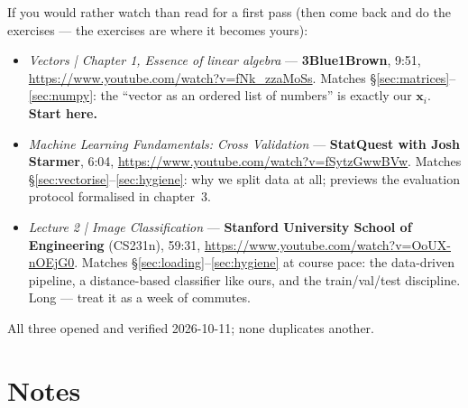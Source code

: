 \begin{rulebox}
If you would rather watch than read for a first pass (then come back and do
the exercises --- the exercises are where it becomes yours):
\begin{itemize}
\item \emph{Vectors | Chapter 1, Essence of linear algebra} ---
  \textbf{3Blue1Brown}, 9:51,
  \url{https://www.youtube.com/watch?v=fNk_zzaMoSs}. Matches \S\ref{sec:matrices}--\ref{sec:numpy}:
  the ``vector as an ordered list of numbers'' is exactly our $\mathbf x_i$.
  \textbf{Start here.}
\item \emph{Machine Learning Fundamentals: Cross Validation} ---
  \textbf{StatQuest with Josh Starmer}, 6:04,
  \url{https://www.youtube.com/watch?v=fSytzGwwBVw}. Matches
  \S\ref{sec:vectorise}--\ref{sec:hygiene}: why we split data at all; previews
  the evaluation protocol formalised in chapter~3.
\item \emph{Lecture 2 | Image Classification} ---
  \textbf{Stanford University School of Engineering} (CS231n), 59:31,
  \url{https://www.youtube.com/watch?v=OoUX-nOEjG0}. Matches \S\ref{sec:loading}--\ref{sec:hygiene}
  at course pace: the data-driven pipeline, a distance-based classifier like
  ours, and the train/val/test discipline. Long --- treat it as a week of
  commutes.
\end{itemize}
All three opened and verified 2026-10-11; none duplicates another.
\end{rulebox}

\section*{Notes}

